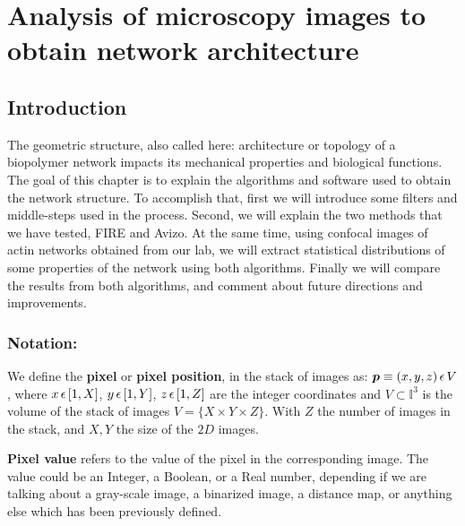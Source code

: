 
\chapter{Analysis of microscopy images to obtain network architecture} %

\label{Chapter-Image} %


\section{Introduction}
The geometric structure, also called here: architecture or topology of a
biopolymer network impacts its mechanical properties and biological functions.
The goal of this chapter is to explain the algorithms and software used to
obtain the network structure. To accomplish that, first we will introduce some
filters and middle-steps used in the process. Second, we will explain the two
methods that we have tested, FIRE and Avizo. At the same time, using confocal
images of actin networks obtained from our lab,  we will extract statistical
distributions of some properties of the network using both algorithms. Finally
we will compare the results from both algorithms, and comment about future
directions and improvements.

\subsection{Notation:}


 We define the \textbf{pixel} or \textbf{pixel position}, in the stack of images as:
 $\boldsymbol{p}\equiv(x,y,z)\, \epsilon \,V$, where
 $x\,\epsilon \,{}[1,X]$, $y\,\epsilon \,{}[1,Y]$, $z\,\epsilon \,{}[1,Z]$ are the integer coordinates and
 $V\subset \mathbb{I}^3$ is the volume of the stack of images $V=\{X\times
 Y\times Z\}$.
 With $Z$ the number of images in the stack, and $X,Y$ the size of the $2D$ images.
 
 \textbf{Pixel value} refers to the value of the pixel in the corresponding
 image.
 The value could be an Integer, a Boolean, or a Real number, depending if we are
 talking about a gray-scale image, a binarized image, a distance map,
 or anything else which has been previously defined.

